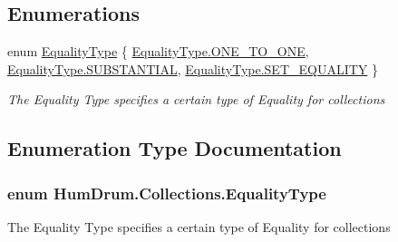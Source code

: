 \subsection*{Enumerations}
\begin{DoxyCompactItemize}
\item 
enum \hyperlink{namespaceHumDrum_1_1Collections_a2285421a46d3601c329012e809a98714}{Equality\+Type} \{ \hyperlink{namespaceHumDrum_1_1Collections_a2285421a46d3601c329012e809a98714a182db2c02318b1abf2a8dbd2b1234a67}{Equality\+Type.\+O\+N\+E\+\_\+\+T\+O\+\_\+\+O\+NE}, 
\hyperlink{namespaceHumDrum_1_1Collections_a2285421a46d3601c329012e809a98714ae265a3eae4d74b0e937cfdf35b6b5863}{Equality\+Type.\+S\+U\+B\+S\+T\+A\+N\+T\+I\+AL}, 
\hyperlink{namespaceHumDrum_1_1Collections_a2285421a46d3601c329012e809a98714aaf4989e63c835cdd469f70b7c4bfd3b4}{Equality\+Type.\+S\+E\+T\+\_\+\+E\+Q\+U\+A\+L\+I\+TY}
 \}\begin{DoxyCompactList}\small\item\em The Equality Type specifies a certain type of Equality for collections \end{DoxyCompactList}
\end{DoxyCompactItemize}


\subsection{Enumeration Type Documentation}
\subsubsection[{\texorpdfstring{Equality\+Type}{EqualityType}}]{\setlength{\rightskip}{0pt plus 5cm}enum {\bf Hum\+Drum.\+Collections.\+Equality\+Type}\hspace{0.3cm}{\ttfamily [strong]}}\hypertarget{namespaceHumDrum_1_1Collections_a2285421a46d3601c329012e809a98714}{}\label{namespaceHumDrum_1_1Collections_a2285421a46d3601c329012e809a98714}


The Equality Type specifies a certain type of Equality for collections 

